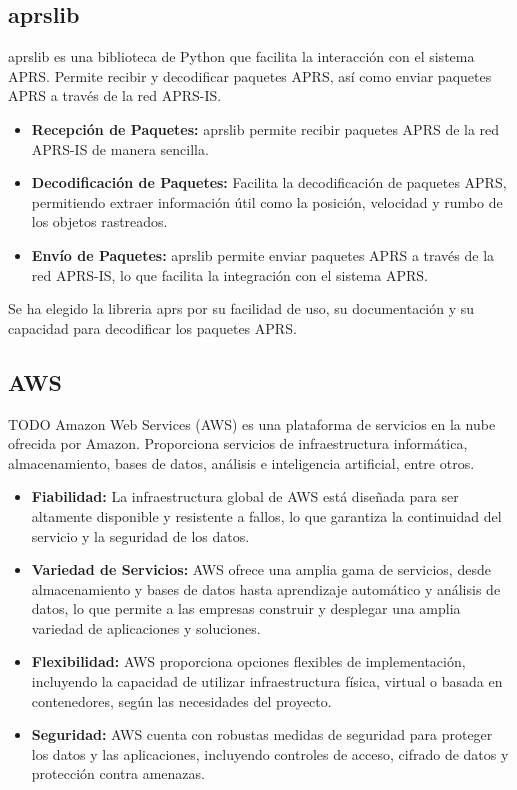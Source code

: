 \subsection{aprslib}
aprslib es una biblioteca de Python que facilita la interacción con el sistema APRS. Permite recibir y decodificar paquetes APRS, así como enviar paquetes APRS a través de la red APRS-IS.
\begin{itemize}
	\item \textbf{Recepción de Paquetes:} aprslib permite recibir paquetes APRS de la red APRS-IS de manera sencilla.
	\item \textbf{Decodificación de Paquetes:} Facilita la decodificación de paquetes APRS, permitiendo extraer información útil como la posición, velocidad y rumbo de los objetos rastreados.
	\item \textbf{Envío de Paquetes:} aprslib permite enviar paquetes APRS a través de la red APRS-IS, lo que facilita la integración con el sistema APRS.
\end{itemize}
Se ha elegido la libreria aprs por su facilidad de uso, su documentación y su capacidad para decodificar los paquetes APRS.
\subsection{AWS}
TODO
Amazon Web Services (AWS) es una plataforma de servicios en la nube ofrecida por Amazon. Proporciona servicios de infraestructura informática, almacenamiento, bases de datos, análisis e inteligencia artificial, entre otros.

\begin{itemize}
	\item \textbf{Fiabilidad:} La infraestructura global de AWS está diseñada para ser altamente disponible y resistente a fallos, lo que garantiza la continuidad del servicio y la seguridad de los datos.
	\item \textbf{Variedad de Servicios:} AWS ofrece una amplia gama de servicios, desde almacenamiento y bases de datos hasta aprendizaje automático y análisis de datos, lo que permite a las empresas construir y desplegar una amplia variedad de aplicaciones y soluciones.
	\item \textbf{Flexibilidad:} AWS proporciona opciones flexibles de implementación, incluyendo la capacidad de utilizar infraestructura física, virtual o basada en contenedores, según las necesidades del proyecto.
	\item \textbf{Seguridad:} AWS cuenta con robustas medidas de seguridad para proteger los datos y las aplicaciones, incluyendo controles de acceso, cifrado de datos y protección contra amenazas.
\end{itemize}

